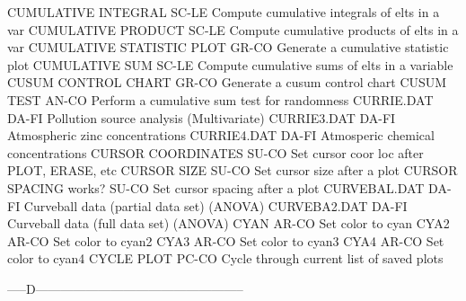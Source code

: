 CUMULATIVE INTEGRAL         SC-LE Compute cumulative integrals of elts in a var
CUMULATIVE PRODUCT          SC-LE Compute cumulative products of elts in a var
CUMULATIVE STATISTIC PLOT   GR-CO Generate a cumulative statistic plot
CUMULATIVE SUM              SC-LE Compute cumulative sums of elts in a variable
CUSUM CONTROL CHART         GR-CO Generate a cusum control chart
CUSUM TEST                  AN-CO Perform a cumulative sum test for randomness
CURRIE.DAT                  DA-FI Pollution source analysis (Multivariate)
CURRIE3.DAT                 DA-FI Atmospheric zinc concentrations
CURRIE4.DAT                 DA-FI Atmosperic chemical concentrations
CURSOR COORDINATES          SU-CO Set cursor coor loc after PLOT, ERASE, etc
CURSOR SIZE                 SU-CO Set cursor size after a plot
CURSOR SPACING works?       SU-CO Set cursor spacing after a plot
CURVEBAL.DAT                DA-FI Curveball data (partial data set) (ANOVA)
CURVEBA2.DAT                DA-FI Curveball data (full data set) (ANOVA)
CYAN                        AR-CO Set color to cyan
CYA2                        AR-CO Set color to cyan2
CYA3                        AR-CO Set color to cyan3
CYA4                        AR-CO Set color to cyan4
CYCLE PLOT                  PC-CO Cycle through current list of saved plots

-----D--------------------------------------------------

